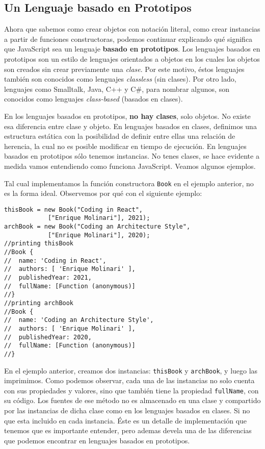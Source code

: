 \documentclass[a4paper, oneside, titlepage, 12pt]{book}
\begin{document}
\subsection{Un Lenguaje basado en Prototipos}

Ahora que sabemos como crear objetos con notación literal, como crear instancias a partir de funciones constructoras, podemos continuar explicando qué significa que JavaScript sea un lenguaje \textbf{basado en prototipos}. Los lenguajes basados en prototipos son un estilo de lenguajes orientados a objetos en los cuales los objetos son creados sin crear previamente una \textit{clase}. Por este motivo, éstos lenguajes también son conocidos como lenguajes \textit{classless} (sin clases). Por otro lado, lenguajes como Smalltalk, Java, C++ y C\#, para nombrar algunos, son conocidos como lenguajes \textit{class-based} (basados en clases).
\newline

En los lenguajes basados en prototipos, \textbf{no hay clases}, solo objetos. No existe esa diferencia entre clase y objeto. En lenguajes basados en clases, definimos una estructura estática con la posibilidad de definir entre ellas una relación de herencia, la cual no es posible modificar en tiempo de ejecución. En lenguajes basados en prototipos sólo tenemos instancias. No tenes clases, se hace evidente a medida vamos entendiendo como funciona JavaScript. Veamos algunos ejemplos.
\newline

Tal cual implementamos la función constructora \texttt{Book} en el ejemplo anterior, no es la forma ideal. Observemos por qué con el siguiente ejemplo:

\begin{verbatim}
thisBook = new Book("Coding in React", 
			["Enrique Molinari"], 2021);
archBook = new Book("Coding an Architecture Style", 
			["Enrique Molinari"], 2020);
//printing thisBook
//Book {
//  name: 'Coding in React',
//  authors: [ 'Enrique Molinari' ],
//  publishedYear: 2021,
//  fullName: [Function (anonymous)]
//}
//printing archBook
//Book {
//  name: 'Coding an Architecture Style',
//  authors: [ 'Enrique Molinari' ],
//  publishedYear: 2020,
//  fullName: [Function (anonymous)]
//}
\end{verbatim}

En el ejemplo anterior, creamos dos instancias: \texttt{thisBook} y \texttt{archBook}, y luego las imprimimos. Como podemos observar, cada una de las instancias no solo cuenta con sus propiedades y valores, sino que también tiene la propiedad \texttt{fullName}, con su código. Los fuentes de ese método no es almacenado en una clase y compartido por las instancias de dicha clase como en los lenguajes basados en clases. Si no que esta incluido en cada instancia. Éste es un detalle de implementación que tenemos que es importante entender, pero ademas devela una de las diferencias que podemos encontrar en lenguajes basados en prototipos.
\newline
\end{document}
